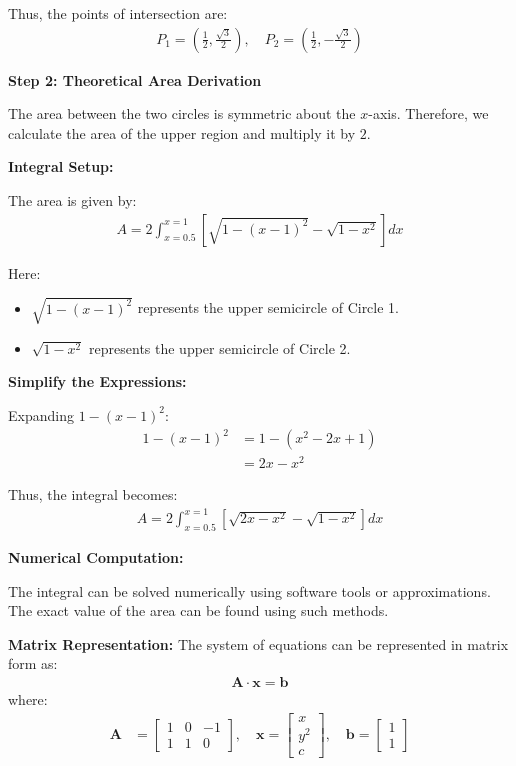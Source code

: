\documentclass[journal]{IEEEtran}
\begin{document}
Thus, the points of intersection are:
\begin{align}
    P_1 = \left(\frac{1}{2}, \frac{\sqrt{3}}{2}\right), \quad P_2 = \left(\frac{1}{2}, -\frac{\sqrt{3}}{2}\right)
\end{align}

\textbf{Step 2: Theoretical Area Derivation}

The area between the two circles is symmetric about the $x$-axis. Therefore, we calculate the area of the upper region and multiply it by $2$.

\textbf{Integral Setup:}

The area is given by:
\begin{align}
    A = 2 \int_{x=0.5}^{x=1} \left[ \sqrt{1 - (x - 1)^2} - \sqrt{1 - x^2} \right] dx
\end{align}

Here:
\begin{itemize}
    \item $\sqrt{1 - (x - 1)^2}$ represents the upper semicircle of Circle 1.
    \item $\sqrt{1 - x^2}$ represents the upper semicircle of Circle 2.
\end{itemize}

\textbf{Simplify the Expressions:}

Expanding $1 - (x - 1)^2$:
\begin{align}
    1 - (x - 1)^2 &= 1 - (x^2 - 2x + 1) \\
    &= 2x - x^2
\end{align}

Thus, the integral becomes:
\begin{align}
    A = 2 \int_{x=0.5}^{x=1} \left[ \sqrt{2x - x^2} - \sqrt{1 - x^2} \right] dx
\end{align}

\textbf{Numerical Computation:}

The integral can be solved numerically using software tools or approximations. The exact value of the area can be found using such methods.

\textbf{Matrix Representation:}
The system of equations can be represented in matrix form as:
\begin{align}
    \bm{A} \cdot \bm{x} = \bm{b}
\end{align}
where:
\begin{align}
    \bm{A} &= \begin{bmatrix}
        1 & 0 & -1 \\
        1 & 1 & 0
    \end{bmatrix}, \quad
    \bm{x} = \begin{bmatrix}
        x \\
        y^2 \\
        c
    \end{bmatrix}, \quad
    \bm{b} = \begin{bmatrix}
        1 \\
        1
    \end{bmatrix}
\end{align}
\end{document}
